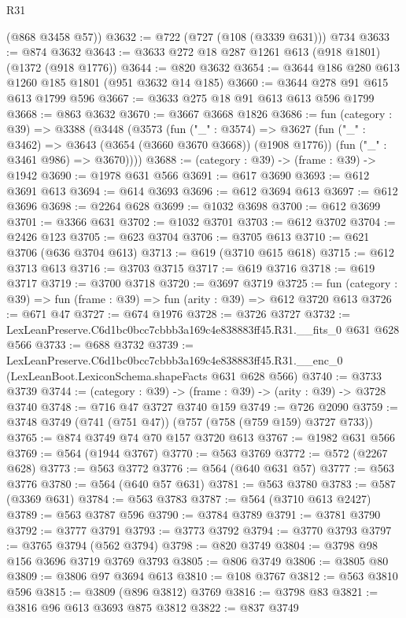 \begin{lexlean}{R31}
\begin{coremodule}
      (@868 @3458 @57))
@3632 := @722 (@727 (@108 (@3339 @631))) @734
@3633 := @874 @3632
@3643 := @3633 @272 @18 @287 @1261 @613 (@918 @1801) (@1372 (@918 @1776))
@3644 := @820 @3632
@3654 := @3644 @186 @280 @613 @1260 @185 @1801 (@951 @3632 @14 @185)
@3660 := @3644 @278 @91 @615 @613 @1799 @596
@3667 := @3633 @275 @18 @91 @613 @613 @596 @1799
@3668 := @863 @3632
@3670 := @3667 @3668 @1826
@3686 := fun (category : @39) =>
  @3388
    (@3448
      (@3573
        (fun ("_" : @3574) =>
        @3627
          (fun ("_" : @3462) => @3643 (@3654 (@3660 @3670 @3668)) (@1908 @1776))
          (fun ("_" : @3461 @986) => @3670))))
@3688 := (category : @39) -> (frame : @39) -> @1942
@3690 := @1978 @631 @566
@3691 := @617 @3690
@3693 := @612 @3691 @613
@3694 := @614 @3693
@3696 := @612 @3694 @613
@3697 := @612 @3696
@3698 := @2264 @628
@3699 := @1032 @3698
@3700 := @612 @3699
@3701 := @3366 @631
@3702 := @1032 @3701
@3703 := @612 @3702
@3704 := @2426 @123
@3705 := @623 @3704
@3706 := @3705 @613
@3710 := @621 @3706 (@636 @3704 @613)
@3713 := @619 (@3710 @615 @618)
@3715 := @612 @3713 @613
@3716 := @3703 @3715
@3717 := @619 @3716
@3718 := @619 @3717
@3719 := @3700 @3718
@3720 := @3697 @3719
@3725 := fun (category : @39) => fun (frame : @39) => fun (arity : @39) => @612 @3720 @613
@3726 := @671 @47
@3727 := @674 @1976
@3728 := @3726 @3727
@3732 := LexLeanPreserve.C6d1bc0bcc7cbbb3a169c4e838883ff45.R31.__fits_0 @631 @628 @566
@3733 := @688 @3732
@3739 := LexLeanPreserve.C6d1bc0bcc7cbbb3a169c4e838883ff45.R31.__enc_0
    (LexLeanBoot.LexiconSchema.shapeFacts @631 @628 @566)
@3740 := @3733 @3739
@3744 := (category : @39) -> (frame : @39) -> (arity : @39) -> @3728 @3740
@3748 := @716 @47 @3727 @3740 @159
@3749 := @726 @2090
@3759 := @3748 @3749 (@741 (@751 @47)) (@757 (@758 (@759 @159) @3727 @733))
@3765 := @874 @3749 @74 @70 @157 @3720 @613
@3767 := @1982 @631 @566
@3769 := @564 (@1944 @3767)
@3770 := @563 @3769
@3772 := @572 (@2267 @628)
@3773 := @563 @3772
@3776 := @564 (@640 @631 @57)
@3777 := @563 @3776
@3780 := @564 (@640 @57 @631)
@3781 := @563 @3780
@3783 := @587 (@3369 @631)
@3784 := @563 @3783
@3787 := @564 (@3710 @613 @2427)
@3789 := @563 @3787 @596
@3790 := @3784 @3789
@3791 := @3781 @3790
@3792 := @3777 @3791
@3793 := @3773 @3792
@3794 := @3770 @3793
@3797 := @3765 @3794 (@562 @3794)
@3798 := @820 @3749
@3804 := @3798 @98 @156 @3696 @3719 @3769 @3793
@3805 := @806 @3749
@3806 := @3805 @80
@3809 := @3806 @97 @3694 @613
@3810 := @108 @3767
@3812 := @563 @3810 @596
@3815 := @3809 (@896 @3812) @3769
@3816 := @3798 @83
@3821 := @3816 @96 @613 @3693 @875 @3812
@3822 := @837 @3749

\end{coremodule}
\end{lexlean}
